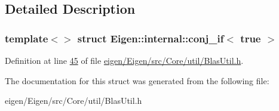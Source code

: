 \subsection{Detailed Description}
\subsubsection*{template$<$$>$\newline
struct Eigen\+::internal\+::conj\+\_\+if$<$ true $>$}



Definition at line \hyperlink{eigen_2_eigen_2src_2_core_2util_2_blas_util_8h_source_l00045}{45} of file \hyperlink{eigen_2_eigen_2src_2_core_2util_2_blas_util_8h_source}{eigen/\+Eigen/src/\+Core/util/\+Blas\+Util.\+h}.



The documentation for this struct was generated from the following file\+:\begin{DoxyCompactItemize}
\item 
eigen/\+Eigen/src/\+Core/util/\+Blas\+Util.\+h\end{DoxyCompactItemize}
